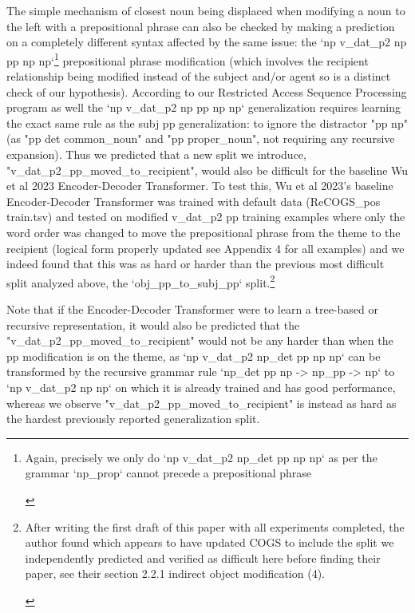 \documentclass[11pt]{article}
\begin{document}
The simple mechanism of closest noun being displaced when modifying a noun to the left with a prepositional phrase can also be checked by making a prediction on a completely different syntax affected by the same issue: the `np v\_dat\_p2 np pp np np`\footnote{
\begin{tiny}
Again, precisely we only do `np v\_dat\_p2 np\_det pp np np` as per the grammar `np\_prop` cannot precede a prepositional phrase
\end{tiny}
} prepositional phrase modification (which involves the recipient relationship being modified instead of the subject and/or agent so is a distinct check of our hypothesis). According to our Restricted Access Sequence Processing program as well the `np v\_dat\_p2 np pp np np` generalization requires learning the exact same rule as the subj pp generalization: to ignore the distractor "pp np" (as "pp det common\_noun" and "pp proper\_noun", not requiring any recursive expansion). Thus we predicted that a new split we introduce, "v\_dat\_p2\_pp\_moved\_to\_recipient", would also be difficult for the baseline Wu et al 2023 Encoder-Decoder Transformer. To test this, Wu et al 2023's baseline Encoder-Decoder Transformer was trained with default data (ReCOGS\_pos train.tsv) and tested on modified v\_dat\_p2 pp training examples where only the word order was changed to move the prepositional phrase from the theme to the recipient (logical form properly updated see Appendix 4 for all examples) and we indeed found that this was as hard or harder than the previous most difficult split analyzed above, the `obj\_pp\_to\_subj\_pp` split.\footnote{
\begin{tiny}
After writing the first draft of this paper with all experiments completed, the author found \cite{li2023slogstructuralgeneralizationbenchmark} which appears to have updated COGS to include the split we independently predicted and verified as difficult here before finding their paper, see their section 2.2.1 indirect object modification (4).
\end{tiny}
}

Note that if the Encoder-Decoder Transformer were to learn a tree-based or recursive representation, it would also be predicted that the "v\_dat\_p2\_pp\_moved\_to\_recipient" would not be any harder than when the pp modification is on the theme, as `np v\_dat\_p2 np\_det pp np np` can be transformed by the recursive grammar rule `np\_det pp np -> np\_pp -> np` to `np v\_dat\_p2 np np` on which it is already trained and has good performance, whereas we observe "v\_dat\_p2\_pp\_moved\_to\_recipient" is instead as hard as the hardest previously reported generalization split.
\end{document}
